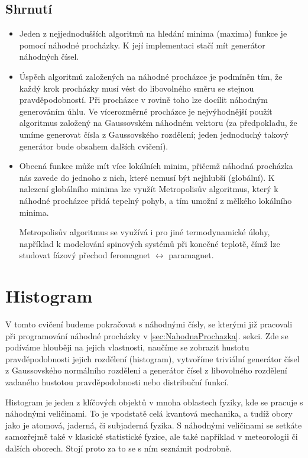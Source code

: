 \documentclass[a4paper,11pt,twoside]{article}
\theoremstyle{red}
\theoremstyle{green}
\begin{document}
\subsection{Shrnutí}
    \begin{itemize}
        \item 
            Jeden z nejjednodušších algoritmů na hledání minima (maxima) funkce je pomocí náhodné procházky.
            K její implementaci stačí mít generátor náhodných čísel.

        \item 
            Úspěch algoritmů založených na náhodné procházce je podmíněn tím, že každý krok procházky musí vést do libovolného směru se stejnou pravděpodobností.
            Při procházce v rovině toho lze docílit náhodným generováním úhlu.
            Ve vícerozměrné procházce je nejvýhodnější použít algoritmus založený na Gaussovském náhodném vektoru (za předpokladu, že umíme generovat čísla z Gaussovského rozdělení; jeden jednoduchý takový generátor bude obsahem dalších cvičení).   
        
        \item 
            Obecná funkce může mít více lokálních minim, přičemž náhodná procházka nás zavede do jednoho z nich, které nemusí být nejhlubší (globální).
            K nalezení globálního minima lze využít Metropolisův algoritmus, který k náhodné procházce přidá tepelný pohyb, a tím umožní  z mělkého lokálního minima.  

            Metropolisův algoritmus se využívá i pro jiné termodynamické úlohy, například k modelování spinových systémů při konečné teplotě, čímž lze studovat fázový přechod feromagnet $\leftrightarrow$ paramagnet.
    \end{itemize}


\section{Histogram}
    V tomto cvičení budeme pokračovat s náhodnými čísly, se kterými již pracovali při programování náhodné procházky v \ref{sec:NahodnaProchazka}. sekci.
    Zde se podíváme hlouběji na jejich vlastnosti, naučíme se zobrazit hustotu pravděpodobnosti jejich rozdělení (histogram), vytvoříme triviální generátor čísel z Gaussovského normálního rozdělení a generátor čísel z libovolného rozdělení zadaného hustotou pravděpodobnosti nebo distribuční funkcí.
       
    Histogram je jeden z klíčových objektů v mnoha oblastech fyziky, kde se pracuje s náhodnými veličinami.
    To je vpodstatě celá kvantová mechanika, a tudíž obory jako je atomová, jaderná, či subjaderná fyzika.
    S náhodnými veličinami se setkáte samozřejmě také v klasické statistické fyzice, ale také například v meteorologii či dalších oborech.
    Stojí proto za to se s ním seznámit podrobně.
\end{document}
